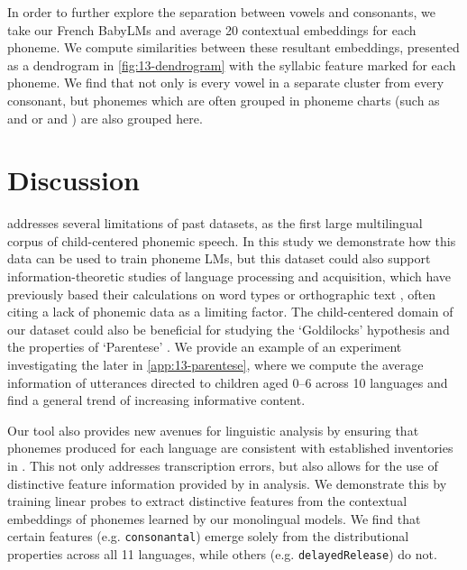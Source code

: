 
In order to further explore the separation between vowels and consonants, we take our French BabyLMs and average 20 contextual embeddings for each phoneme. We compute similarities between these resultant embeddings, presented as a dendrogram in \cref{fig:13-dendrogram} with the syllabic feature marked for each phoneme. We find that not only is every vowel in a separate cluster from every consonant, but phonemes which are often grouped in phoneme charts (such as  and  or  and \ttipa{\textschwa}) are also grouped here.

\section{Discussion}

\ipachildes addresses several limitations of past datasets, as the first large multilingual corpus of child-centered phonemic speech. In this study we demonstrate how this data can be used to train phoneme LMs, but this dataset could also support information-theoretic studies of language processing and acquisition, which have previously based their calculations on word types \citep{piantadosi2011word, dautriche2017words, pimentel2020phonotactic} or orthographic text \citep{mahowald2013info, dautriche2017wordform, futrell2020lossy}, often citing a lack of phonemic data as a limiting factor. %
The child-centered domain of our dataset could also be beneficial for studying the `Goldilocks' hypothesis \citep{kidd2014goldilocks} and the properties of `Parentese' \citep{ramirez2017look}. We provide an example of an experiment investigating the later in \cref{app:13-parentese}, where we compute the average information of utterances directed to children aged 0--6 across 10 languages and find a general trend of increasing informative content.

Our \corpusphonemizer tool also provides new avenues for linguistic analysis by ensuring that phonemes produced for each language are consistent with established inventories in \phoible. This not only addresses transcription errors, but also allows for the use of distinctive feature information provided by \phoible in analysis. We demonstrate this by training linear probes to extract distinctive features from the contextual embeddings of phonemes learned by our monolingual models. We find that certain features (e.g. \texttt{consonantal}) emerge solely from the distributional properties across all 11 languages, while others (e.g. \texttt{delayedRelease}) do not. 


